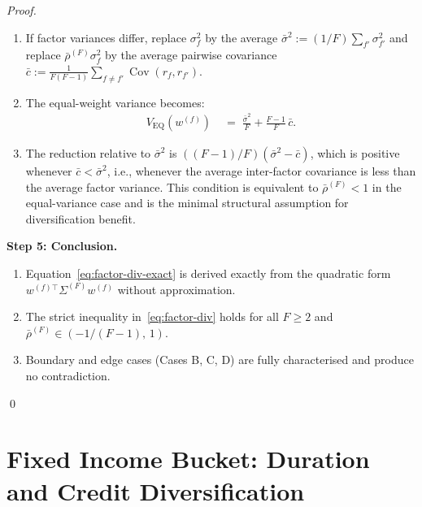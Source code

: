 \documentclass[12pt,openany]{book}
\newcommand{\bfw}{\mathbf{w}}
\DeclareMathOperator{\Cov}{Cov}
\numberwithin{equation}{chapter}
\theoremstyle{plain}
\theoremstyle{definition}
\theoremstyle{remark}
\def\bfw{w}%
\begin{document}
\begin{proof}
\begin{enumerate}
  \item If factor variances differ, replace $\sigma_f^2$ by the
        average $\bar{\sigma}^2 := (1/F)\sum_{f'}\sigma_{f'}^2$
        and replace $\bar{\rho}^{(F)}\sigma_f^2$ by the average
        pairwise covariance
        $\bar{c} := \frac{1}{F(F-1)}\sum_{f\neq f'}\Cov(r_f,r_{f'})$.
  \item The equal-weight variance becomes:
        \begin{align}
          V_{\mathrm{EQ}}(\bfw^{(f)})
          &\;=\; \frac{\bar{\sigma}^2}{F}
                 + \frac{F-1}{F}\,\bar{c}.
          \label{eq:factor-div-hetero}
        \end{align}
  \item The reduction relative to $\bar{\sigma}^2$ is
        $((F-1)/F)(\bar{\sigma}^2 - \bar{c})$, which is positive
        whenever $\bar{c} < \bar{\sigma}^2$, i.e., whenever the
        average inter-factor covariance is less than the average
        factor variance.  This condition is equivalent to
        $\bar{\rho}^{(F)} < 1$ in the equal-variance case and
        is the minimal structural assumption for diversification
        benefit.
\end{enumerate}

\medskip
\noindent\textbf{Step 5: Conclusion.}

\begin{enumerate}
  \item Equation~\eqref{eq:factor-div-exact} is derived exactly
        from the quadratic form $\bfw^{(f)\top}\Sigma^{(F)}\bfw^{(f)}$
        without approximation.
  \item The strict inequality in~\eqref{eq:factor-div} holds for
        all $F \geq 2$ and $\bar{\rho}^{(F)} \in (-1/(F-1),\,1)$.
  \item Boundary and edge cases (Cases B, C, D) are fully
        characterised and produce no contradiction.
\end{enumerate}
\qed
\end{proof}

\section{Fixed Income Bucket: Duration and Credit Diversification}
\end{document}
